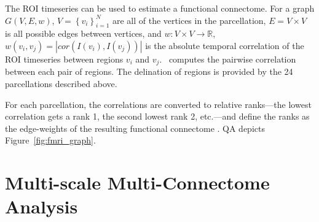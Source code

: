 \documentclass[11pt]{article}
\begin{document}
The ROI timeseries can be used to estimate a functional connectome. For a graph $G(V, E, w)$, $V = \left\{v_i\right\}_{i=1}^N$ are all of the vertices in the parcellation, $E = V \times V$ is all possible edges between vertices, and $w: V \times V \rightarrow \mathbb{R}$, $w(v_i, v_j) = \left|cor\left(I\left(v_i\right), I\left(v_j\right)\right)\right|$ is  the absolute temporal correlation of the ROI timeseries between regions $v_i$ and $v_j$.
\ndmg~computes the pairwise correlation between each pair of regions. 
The delination of regions is provided by the 24 parcellations described above. 

For each parcellation, the correlations are converted to relative ranks---the lowest correlation gets a rank 1, the second lowest rank 2, etc.---and define the ranks as the edge-weights of the resulting functional connectome \cite{discriminability}.
QA depicts Figure~\ref{fig:fmri_graph}.




%


\section{Multi-scale Multi-Connectome Analysis}
\label{app:graphstats}
\end{document}
